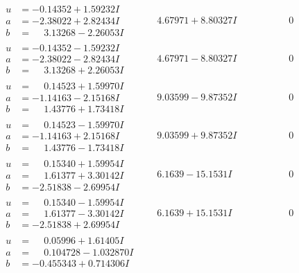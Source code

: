\documentclass[1p]{elsarticle_modified}
\theoremstyle{definition}
\begin{document}
$$\begin{array}{c|c|c}
\begin{aligned}
u &= -0.14352 + 1.59232 I \\
a &= -2.38022 + 2.82434 I \\
b &= \phantom{-}3.13268 - 2.26053 I\end{aligned}
 & \phantom{-}4.67971 + 8.80327 I & \phantom{-0.000000 } 0 \\ \hline\begin{aligned}
u &= -0.14352 - 1.59232 I \\
a &= -2.38022 - 2.82434 I \\
b &= \phantom{-}3.13268 + 2.26053 I\end{aligned}
 & \phantom{-}4.67971 - 8.80327 I & \phantom{-0.000000 } 0 \\ \hline\begin{aligned}
u &= \phantom{-}0.14523 + 1.59970 I \\
a &= -1.14163 - 2.15168 I \\
b &= \phantom{-}1.43776 + 1.73418 I\end{aligned}
 & \phantom{-}9.03599 - 9.87352 I & \phantom{-0.000000 } 0 \\ \hline\begin{aligned}
u &= \phantom{-}0.14523 - 1.59970 I \\
a &= -1.14163 + 2.15168 I \\
b &= \phantom{-}1.43776 - 1.73418 I\end{aligned}
 & \phantom{-}9.03599 + 9.87352 I & \phantom{-0.000000 } 0 \\ \hline\begin{aligned}
u &= \phantom{-}0.15340 + 1.59954 I \\
a &= \phantom{-}1.61377 + 3.30142 I \\
b &= -2.51838 - 2.69954 I\end{aligned}
 & \phantom{-}6.1639 - 15.1531 I & \phantom{-0.000000 } 0 \\ \hline\begin{aligned}
u &= \phantom{-}0.15340 - 1.59954 I \\
a &= \phantom{-}1.61377 - 3.30142 I \\
b &= -2.51838 + 2.69954 I\end{aligned}
 & \phantom{-}6.1639 + 15.1531 I & \phantom{-0.000000 } 0 \\ \hline\begin{aligned}
u &= \phantom{-}0.05996 + 1.61405 I \\
a &= \phantom{-}0.104728 - 1.032870 I \\
b &= -0.455343 + 0.714306 I\end{aligned}

\end{array}$$
\end{document}

